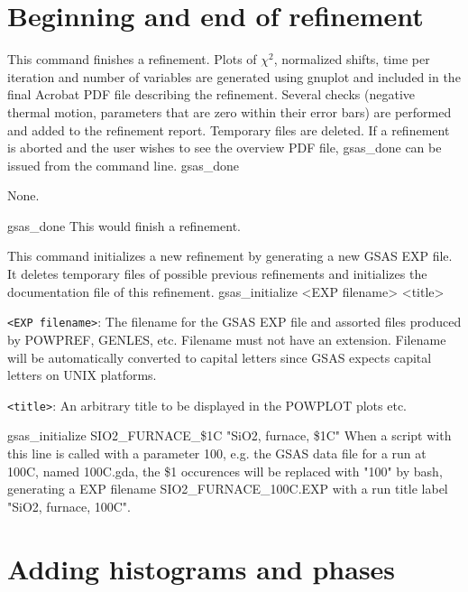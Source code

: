\section{Beginning and end of refinement}

{
This command finishes a refinement. Plots of $\chi^2$, normalized shifts, time per iteration and number of variables are generated using gnuplot and included in the final Acrobat PDF file describing the refinement. Several checks (negative thermal motion, parameters that are zero within their error bars) are performed and added to the refinement report. Temporary files are deleted. If a refinement is aborted and the user wishes to see the overview PDF file, gsas\_done can be issued from the command line.
}{
gsas\_done
}{
\item None.
}{
gsas\_done
}{
This would finish a refinement.
}

{
This command initializes a new refinement by generating a new GSAS EXP file. It deletes temporary files of possible previous refinements and initializes the documentation file of this refinement.
}{
gsas\_initialize <EXP filename> <title>
}{
\item \texttt{<EXP filename>}: The filename for the GSAS EXP file and assorted files produced by POWPREF, GENLES, etc. Filename must not have an extension. Filename will be automatically converted to capital letters since GSAS expects capital letters on UNIX platforms.
\item \texttt{<title>}: An arbitrary title to be displayed in the POWPLOT plots etc.
}{
gsas\_initialize SIO2\_FURNACE\_\$1C "SiO2, furnace, \$1C"
}{
When a script with this line is called with a parameter 100, e.g. the GSAS data file for a run at  100C, 
named 100C.gda, the \$1 occurences will be replaced with "100" by bash, generating a EXP filename 
SIO2\_FURNACE\_100C.EXP with a run title label "SiO2, furnace, 100C".
}

\section{Adding histograms and phases}

